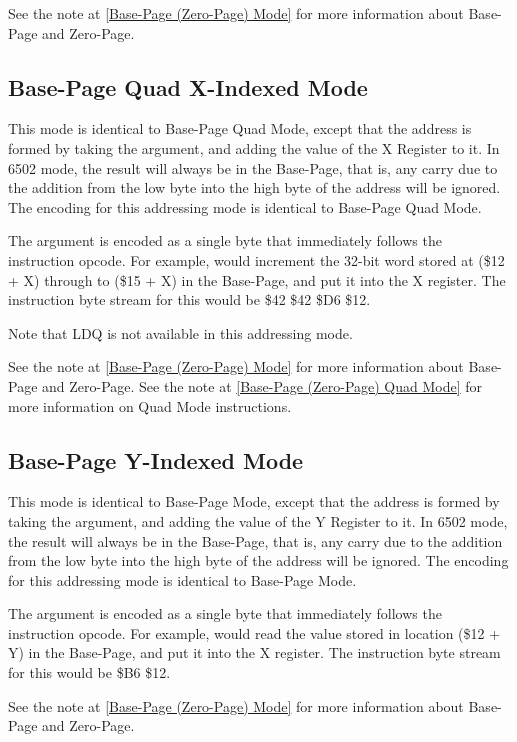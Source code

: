 See the note at \ref{Base-Page (Zero-Page) Mode} for more information about Base-Page and Zero-Page.

\subsection{Base-Page Quad X-Indexed Mode}

This mode is identical to Base-Page Quad Mode, except that the address is formed by taking the
argument, and adding the value of the X Register to it.  In 6502 mode, the result will always
be in the Base-Page, that is, any carry due to the addition from the low byte into the high byte
of the address will be ignored.  The encoding for this addressing mode is identical to Base-Page Quad
Mode.

The argument is encoded as a single byte that immediately follows the instruction opcode.
For example,  would increment the 32-bit word stored at (\$12 + X) through to (\$15 + X) in the Base-Page,
and put it into the X register.  The instruction byte stream for this would be \$42 \$42 \$D6 \$12.

Note that LDQ is not available in this addressing mode.

See the note at \ref{Base-Page (Zero-Page) Mode} for more information about Base-Page and Zero-Page.
See the note at \ref{Base-Page (Zero-Page) Quad Mode} for more information on Quad Mode instructions.

\subsection{Base-Page Y-Indexed Mode}

This mode is identical to Base-Page Mode, except that the address is formed by taking the
argument, and adding the value of the Y Register to it.  In 6502 mode, the result will always
be in the Base-Page, that is, any carry due to the addition from the low byte into the high byte
of the address will be ignored.  The encoding for this addressing mode is identical to Base-Page
Mode.

The argument is encoded as a single byte that immediately follows the instruction opcode.
For example,  would read the value stored in location (\$12 + Y) in the Base-Page,
and put it into the X register.  The instruction byte stream for this would be \$B6 \$12.

See the note at \ref{Base-Page (Zero-Page) Mode} for more information about Base-Page and Zero-Page.

